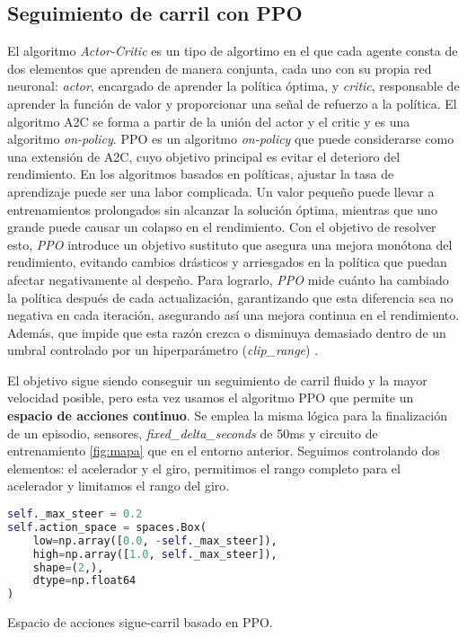 \subsection{Seguimiento de carril con \ac{PPO}}

El algoritmo \textit{Actor-Critic} es un tipo de algortimo en el que cada agente consta de dos elementos que aprenden de manera conjunta, cada uno con su propia red neuronal: \textit{actor}, encargado de aprender la política óptima, y \textit{critic}, responsable de aprender la función de valor y proporcionar una señal de refuerzo a la política. El algoritmo \ac{A2C} se forma a partir de la unión del actor y el critic y es una algoritmo \textit{on-policy}. \ac{PPO} es un algoritmo \textit{on-policy} que puede considerarse como una extensión de \ac{A2C}, cuyo objetivo principal es evitar el deterioro del rendimiento. En los algoritmos basados en políticas, ajustar la tasa de aprendizaje puede ser una labor complicada. Un valor pequeño puede llevar a entrenamientos prolongados sin alcanzar la solución óptima, mientras que uno grande puede causar un colapso en el rendimiento. Con el objetivo de resolver esto, \textit{PPO} introduce un objetivo sustituto que asegura una mejora monótona del rendimiento, evitando cambios drásticos y arriesgados en la política que puedan afectar negativamente al despeño. Para lograrlo, \textit{PPO} mide cuánto ha cambiado la política después de cada actualización, garantizando que esta diferencia sea no negativa en cada iteración, asegurando así una mejora continua en el rendimiento. Además, que impide que esta razón crezca o disminuya demasiado dentro de un umbral controlado por un hiperparámetro (\textit{clip\_range}) \cite{drl}. 

El objetivo sigue siendo conseguir un seguimiento de carril fluido y la mayor velocidad posible, pero esta vez usamos el algoritmo \ac{PPO} que permite un \textbf{espacio de acciones continuo}. Se emplea la misma lógica para la finalización de un episodio, sensores, \textit{fixed\_delta\_seconds} de 50ms y circuito de entrenamiento \ref{fig:mapa} que en el entorno anterior. Seguimos controlando dos elementos: el acelerador y el giro, permitimos el rango completo para el acelerador y limitamos el rango del giro.

\begin{code}[h]
\begin{lstlisting}[language=Python]
self._max_steer = 0.2
self.action_space = spaces.Box(
    low=np.array([0.0, -self._max_steer]),
    high=np.array([1.0, self._max_steer]),
    shape=(2,),
    dtype=np.float64
)
\end{lstlisting}
\caption[Espacio de acciones sigue-carril basado en \ac{PPO}]{Espacio de acciones sigue-carril basado en \ac{PPO}.}
\label{cod:acc_ppo}
\end{code}


